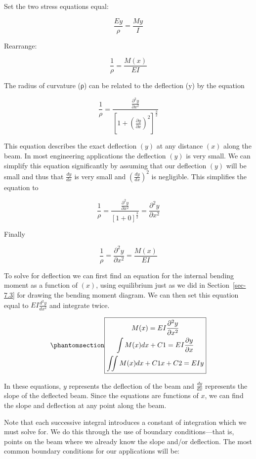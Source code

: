 \documentclass[
  letterpaper,
  DIV=11,
  numbers=noendperiod]{scrreprt}
\theoremstyle{definition}
\theoremstyle{remark}
\begin{document}
Set the two stress equations equal:

\[
\frac{E y}{\rho}=\frac{M y}{I}
\]

Rearrange:

\[
\frac{1}{\rho}=\frac{M(x)}{E I}
\]

The radius of curvature (ρ) can be related to the deflection (y) by the
equation

\[
\frac{1}{\rho}=\frac{\frac{\partial^{2} y}{\partial x^{2}}}{\left[1+\left(\frac{\partial y}{\partial x}\right)^{2}\right]^{\frac{3}{2}}}
\]

This equation describes the exact deflection \((y)\) at any distance
\((x)\) along the beam. In most engineering applications the deflection
\((y)\) is very small. We can simplify this equation significantly by
assuming that our deflection \((y)\) will be small and thus that
\(\frac{d y}{d x}\) is very small and
\(\left(\frac{d y}{d x}\right)^{2}\) is negligible. This simplifies the
equation to

\[
\frac{1}{\rho}=\frac{\frac{\partial^{2} y}{\partial x^{2}}}{[1+0]^{\frac{3}{2}}}=\frac{\partial^{2} y}{\partial x^{2}}
\]

Finally

\[
\frac{1}{\rho}=\frac{\partial^{2} y}{\partial x^{2}}=\frac{M(x)}{E I}
\]

To solve for deflection we can first find an equation for the internal
bending moment as a function of \((x)\), using equilibrium just as we
did in Section~\ref{sec-7.3} for drawing the bending moment diagram. We
can then set this equation equal to \(E I \frac{d^{2} y}{d x^{2}}\) and
integrate twice.

\begin{equation}\phantomsection\label{eq-11.1}{
\boxed{\begin{gathered}
M(x)=E I \frac{\partial^{2} y}{\partial x^{2}} \\
\int M(x) d x+C 1=E I \frac{\partial y}{\partial x} \\
\iint M(x) d x+C 1 x+C 2=E I y
\end{gathered}}
}\end{equation}

In these equations, \(y\) represents the deflection of the beam and
\(\frac{d y}{d x}\) represents the slope of the deflected beam. Since
the equations are functions of \(x\), we can find the slope and
deflection at any point along the beam.

Note that each successive integral introduces a constant of integration
which we must solve for. We do this through the use of boundary
conditions---that is, points on the beam where we already know the slope
and/or deflection. The most common boundary conditions for our
applications will be:
\end{document}
